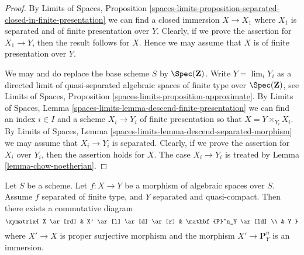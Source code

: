 \begin{proof}
By
Limits of Spaces, Proposition
\ref{spaces-limits-proposition-separated-closed-in-finite-presentation}
we can find a closed immersion $X \to X_1$ where $X_1$ is separated
and of finite presentation over $Y$. Clearly, if we prove the assertion
for $X_1 \to Y$, then the result follows for $X$. Hence we may assume that
$X$ is of finite presentation over $Y$.

\medskip\noindent
We may and do replace the base scheme $S$ by $\Spec(\mathbf{Z})$.
Write $Y = \lim_i Y_i$ as a directed limit of
quasi-separated algebraic spaces of finite type over $\Spec(\mathbf{Z})$, see
Limits of Spaces,
Proposition \ref{spaces-limits-proposition-approximate}.
By
Limits of Spaces,
Lemma \ref{spaces-limits-lemma-descend-finite-presentation}
we can
find an index $i \in I$ and a scheme $X_i \to Y_i$ of finite presentation
so that $X = Y \times_{Y_i} X_i$.
By
Limits of Spaces,
Lemma \ref{spaces-limits-lemma-descend-separated-morphism}
we may assume that $X_i \to Y_i$ is separated.
Clearly, if we prove the assertion for
$X_i$ over $Y_i$, then the assertion holds for $X$. The case
$X_i \to Y_i$ is treated by
Lemma \ref{lemma-chow-noetherian}.
\end{proof}

\begin{lemma}
\label{lemma-chow-finite-type-separated}
Let $S$ be a scheme. Let $f : X \to Y$ be a morphism of algebraic spaces
over $S$. Assume $f$ separated of finite type, and $Y$ separated and
quasi-compact. Then there exists a commutative diagram
$$
\xymatrix{
X \ar[rd] & X' \ar[l] \ar[d] \ar[r] & \mathbf{P}^n_Y \ar[ld] \\
& Y
}
$$
where $X' \to X$ is proper surjective morphism
and the morphism $X' \to \mathbf{P}^n_Y$ is an immersion.
\end{lemma}

